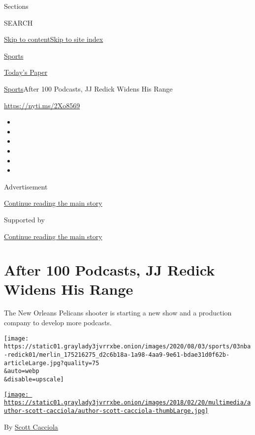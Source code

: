 Sections

SEARCH

\protect\hyperlink{site-content}{Skip to
content}\protect\hyperlink{site-index}{Skip to site index}

\href{https://www.nytimes3xbfgragh.onion/section/sports}{Sports}

\href{https://myaccount.nytimes3xbfgragh.onion/auth/login?response_type=cookie\&client_id=vi}{}

\href{https://www.nytimes3xbfgragh.onion/section/todayspaper}{Today's
Paper}

\href{/section/sports}{Sports}\textbar{}After 100 Podcasts, JJ Redick
Widens His Range

\url{https://nyti.ms/2Xo8569}

\begin{itemize}
\item
\item
\item
\item
\item
\item
\end{itemize}

Advertisement

\protect\hyperlink{after-top}{Continue reading the main story}

Supported by

\protect\hyperlink{after-sponsor}{Continue reading the main story}

\hypertarget{after-100-podcasts-jj-redick-widens-his-range}{%
\section{After 100 Podcasts, JJ Redick Widens His
Range}\label{after-100-podcasts-jj-redick-widens-his-range}}

The New Orleans Pelicans shooter is starting a new show and a production
company to develop more podcasts.

\texttt{[image: https://static01.graylady3jvrrxbe.onion/images/2020/08/03/sports/03nba-redick01/merlin\_175216275\_d2c6b18a-1a98-4aa9-9e61-bdae31d0f62b-articleLarge.jpg?quality=75\\\&auto=webp\\\&disable=upscale]}

\href{https://www.nytimes3xbfgragh.onion/by/scott-cacciola}{\texttt{[image: https://static01.graylady3jvrrxbe.onion/images/2018/02/20/multimedia/author-scott-cacciola/author-scott-cacciola-thumbLarge.jpg]}}

By \href{https://www.nytimes3xbfgragh.onion/by/scott-cacciola}{Scott
Cacciola}

